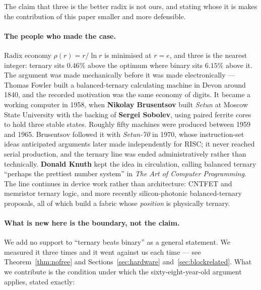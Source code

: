 \documentclass[11pt]{article}
\theoremstyle{definition}
\begin{document}
The claim that three is the better radix is not ours, and stating whose it is
makes the contribution of this paper smaller and more defensible.

\paragraph{The people who made the case.} Radix economy $\rho(r) = r/\ln r$ is
minimised at $r = e$, and three is the nearest integer: ternary sits $0.46\%$
above the optimum where binary sits $6.15\%$ above it. The argument was made
mechanically before it was made electronically --- Thomas Fowler built a
balanced-ternary calculating machine in Devon around 1840, and the recorded
motivation was the same economy of digits. It became a working computer in 1958,
when \textbf{Nikolay Brusentsov} built \emph{Setun} at Moscow State University
with the backing of \textbf{Sergei Sobolev}, using paired ferrite cores to hold
three stable states. Roughly fifty machines were produced between 1959 and 1965.
Brusentsov followed it with \emph{Setun-70} in 1970, whose instruction-set ideas
anticipated arguments later made independently for RISC; it never reached serial
production, and the ternary line was ended administratively rather than
technically. \textbf{Donald Knuth} kept the idea in circulation, calling balanced
ternary ``perhaps the prettiest number system'' in \emph{The Art of Computer
Programming}. The line continues in device work rather than architecture: CNTFET
and memristor ternary logic, and more recently silicon-photonic balanced-ternary
proposals, all of which build a fabric whose \emph{position} is physically
ternary.

\paragraph{What is new here is the boundary, not the claim.} We add no support to
``ternary beats binary'' as a general statement. We measured it three times and it
went against us each time --- see Theorem~\ref{thm:nofree} and
Sections~\ref{sec:hardware} and~\ref{sec:blockrelated}. What we contribute is the
condition under which the sixty-eight-year-old argument applies, stated exactly:
\end{document}
